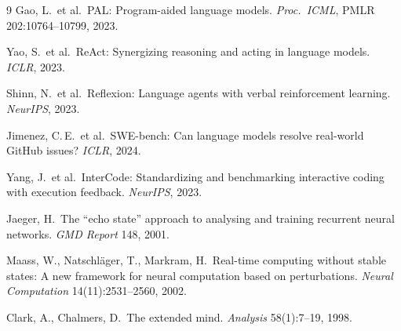 \documentclass[10.5pt]{article}
\begin{document}
\begin{thebibliography}{9}
 Gao, L.\ et al.\ PAL: Program-aided language models.
  \textit{Proc.\ ICML}, PMLR 202:10764--10799, 2023.

 Yao, S.\ et al.\ ReAct: Synergizing reasoning and acting
  in language models. \textit{ICLR}, 2023.

 Shinn, N.\ et al.\ Reflexion: Language agents with
  verbal reinforcement learning. \textit{NeurIPS}, 2023.

 Jimenez, C.\,E.\ et al.\ SWE-bench: Can language
  models resolve real-world GitHub issues? \textit{ICLR}, 2024.

 Yang, J.\ et al.\ InterCode: Standardizing and
  benchmarking interactive coding with execution feedback. \textit{NeurIPS}, 2023.

 Jaeger, H.\ The ``echo state'' approach to analysing and
  training recurrent neural networks. \textit{GMD Report} 148, 2001.

 Maass, W., Natschl\"{a}ger, T., Markram, H.\ Real-time
  computing without stable states: A new framework for neural computation based
  on perturbations. \textit{Neural Computation} 14(11):2531--2560, 2002.

 Clark, A., Chalmers, D.\ The extended mind.
  \textit{Analysis} 58(1):7--19, 1998.
\end{thebibliography}
\end{document}
